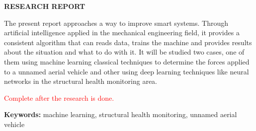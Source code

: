 \begin{center}
	\vspace{100pt}
	{\Large\sffamily\bfseries RESEARCH REPORT}
\end{center}
\noindent
The present report approaches a way to improve smart systems. Through artificial intelligence applied in the mechanical engineering field, it provides a consistent algorithm that can reads data, trains the machine and provides results about the situation and what to do with it. It will be studied two cases, one of them using machine learning classical techniques to determine the forces applied to a unnamed aerial vehicle and other using deep learning techniques like neural networks in the structural health monitoring area. 

\noindent
\textcolor{red}{Complete after the research is done.}

\noindent
{\bfseries Keywords:} machine learning, structural health monitoring, unnamed aerial vehicle

\clearpage